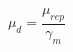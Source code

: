 \documentclass[12pt]{article}
\begin{document}
\begin{displaymath}
\mu_d = \frac {\mu_{rep}} {\gamma_m}
\end{displaymath}
\end{document}
